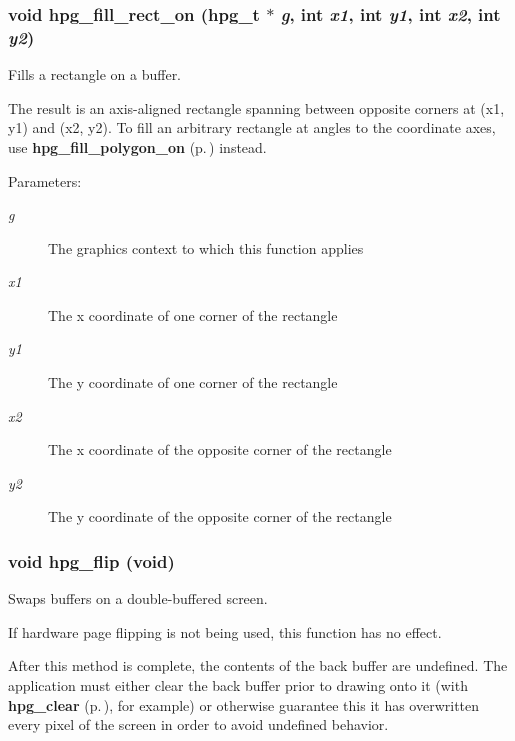\subsubsection{\setlength{\rightskip}{0pt plus 5cm}void hpg\_\-fill\_\-rect\_\-on ({\bf hpg\_\-t} $\ast$ {\em g}, int {\em x1}, int {\em y1}, int {\em x2}, int {\em y2})}\label{hpgraphics_8h_a46}


Fills a rectangle on a buffer.

The result is an axis-aligned rectangle spanning between opposite corners at (x1, y1) and (x2, y2). To fill an arbitrary rectangle at angles to the coordinate axes, use {\bf hpg\_\-fill\_\-polygon\_\-on} {\rm (p.\,\pageref{hpgraphics_8h_a54})} instead.\begin{Desc}
\item[Parameters: ]\par
\begin{description}
\item[{\em 
g}]The graphics context to which this function applies \item[{\em 
x1}]The x coordinate of one corner of the rectangle \item[{\em 
y1}]The y coordinate of one corner of the rectangle \item[{\em 
x2}]The x coordinate of the opposite corner of the rectangle \item[{\em 
y2}]The y coordinate of the opposite corner of the rectangle \end{description}
\end{Desc}
\subsubsection{\setlength{\rightskip}{0pt plus 5cm}void hpg\_\-flip (void)}\label{hpgraphics_8h_a34}


Swaps buffers on a double-buffered screen.

If hardware page flipping is not being used, this function has no effect.

After this method is complete, the contents of the back buffer are undefined. The application must either clear the back buffer prior to drawing onto it (with {\bf hpg\_\-clear} {\rm (p.\,\pageref{hpgraphics_8h_a39})}, for example) or otherwise guarantee this it has overwritten every pixel of the screen in order to avoid undefined behavior. 
